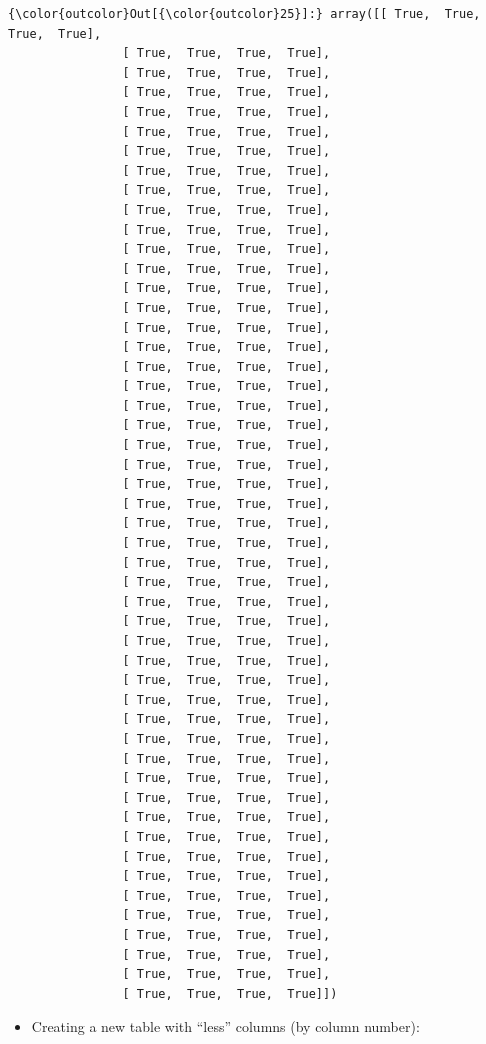 \documentclass[11pt]{article}
\providecommand{\tightlist}{%
      \setlength{\itemsep}{0pt}\setlength{\parskip}{0pt}}
\begin{document}
\begin{Verbatim}[commandchars=\\\{\}]
{\color{outcolor}Out[{\color{outcolor}25}]:} array([[ True,  True,  True,  True],
                [ True,  True,  True,  True],
                [ True,  True,  True,  True],
                [ True,  True,  True,  True],
                [ True,  True,  True,  True],
                [ True,  True,  True,  True],
                [ True,  True,  True,  True],
                [ True,  True,  True,  True],
                [ True,  True,  True,  True],
                [ True,  True,  True,  True],
                [ True,  True,  True,  True],
                [ True,  True,  True,  True],
                [ True,  True,  True,  True],
                [ True,  True,  True,  True],
                [ True,  True,  True,  True],
                [ True,  True,  True,  True],
                [ True,  True,  True,  True],
                [ True,  True,  True,  True],
                [ True,  True,  True,  True],
                [ True,  True,  True,  True],
                [ True,  True,  True,  True],
                [ True,  True,  True,  True],
                [ True,  True,  True,  True],
                [ True,  True,  True,  True],
                [ True,  True,  True,  True],
                [ True,  True,  True,  True],
                [ True,  True,  True,  True],
                [ True,  True,  True,  True],
                [ True,  True,  True,  True],
                [ True,  True,  True,  True],
                [ True,  True,  True,  True],
                [ True,  True,  True,  True],
                [ True,  True,  True,  True],
                [ True,  True,  True,  True],
                [ True,  True,  True,  True],
                [ True,  True,  True,  True],
                [ True,  True,  True,  True],
                [ True,  True,  True,  True],
                [ True,  True,  True,  True],
                [ True,  True,  True,  True],
                [ True,  True,  True,  True],
                [ True,  True,  True,  True],
                [ True,  True,  True,  True],
                [ True,  True,  True,  True],
                [ True,  True,  True,  True],
                [ True,  True,  True,  True],
                [ True,  True,  True,  True],
                [ True,  True,  True,  True],
                [ True,  True,  True,  True],
                [ True,  True,  True,  True]])
\end{Verbatim}
            
    \begin{itemize}
\tightlist
\item
  Creating a new table with ``less'' columns (by column number):
\end{itemize}
\end{document}

